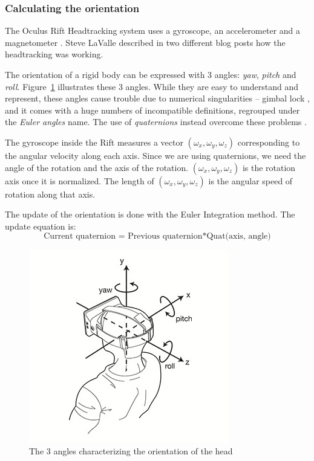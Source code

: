 \documentclass[12pt]{article}
\begin{document}
\subsubsection{Calculating the orientation}
The Oculus Rift Headtracking system uses a gyroscope, an accelerometer and a magnetometer \cite{Oculus2}. Steve LaValle described in two different blog posts \cite{OculusBlog1, OculusBlog2} how the headtracking was working.

The orientation of a rigid body can be expressed with 3 angles: \textit{yaw}, \textit{pitch} and \textit{roll}. Figure~\ref{fig:ypr} illustrates these 3 angles. While they are easy to understand and represent, these angles cause trouble due to numerical singularities -- gimbal lock \cite{lock}, and it comes with a huge numbers of incompatible definitions, regrouped under the \textit{Euler angles} name. The use of \textit{quaternions} instead overcome these problems \cite{Quat}.

The gyroscope inside the Rift measures a vector $(\omega_x,\omega_y,\omega_z)$ corresponding to the angular velocity along each axis. Since we are using quaternions, we need the angle of the rotation and the axis of the rotation. $(\omega_x,\omega_y,\omega_z)$ is the rotation axis once it is normalized. The length of $(\omega_x,\omega_y,\omega_z)$ is the angular speed of rotation along that axis.

The update of the orientation is done with the Euler Integration method. The update equation is:
$$\text{Current quaternion = Previous quaternion} * \text{Quat(axis, angle)}$$

\begin{figure}[h]
  \centering
  \includegraphics[scale=3]{OculusHead.jpg}
  \caption{\label{fig:ypr} The 3 angles characterizing the orientation of the head}
\end{figure}
\end{document}
